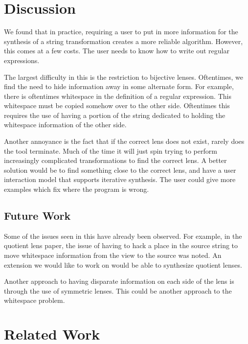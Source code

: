 \documentclass[numbers]{sigplanconf}
\begin{document}
\section{Discussion}

We found that in practice, requiring a user to put in more information for the
synthesis of a string transformation creates a more reliable algorithm.
However, this comes at a few costs.  The user needs to know how to write out
regular expressions.

The largest difficulty in this is the restriction to bijective lenses.
Oftentimes, we find the need to hide information away in some alternate form.
For example, there is oftentimes whitespace in the definition of a regular
expression.  This whitespace must be copied somehow over to the other side.
Oftentimes this requires the use of having a portion of the string dedicated to
holding the whitespace information of the other side.

Another annoyance is the fact that if the correct lens does not exist,
rarely does the tool terminate.  Much of the time it will just spin trying to
perform increasingly complicated transformations to find the correct lens.
A better solution would be to find something close to the correct lens, and have
a user interaction model that supports iterative synthesis.  The user could give
more examples which fix where the program is wrong.

\subsection{Future Work}
Some of the issues seen in this have already been observed.  For example, in the
quotient lens paper, the issue of having to hack a place in the source string to
move whitespace information from the view to the source was noted.  An extension
we would like to work on would be able to synthesize quotient lenses.

Another approach to having disparate information on each side of the lens is
through the use of symmetric lenses.  This could be another approach to the
whitespace problem. 


\section{Related Work}
\end{document}
